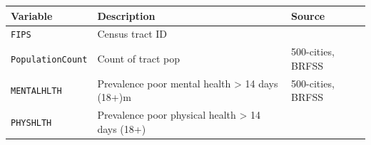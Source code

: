 \documentclass[
]{book}
\newcommand{\passthrough}[1]{#1}
\begin{document}
\begin{longtable}[]{@{}lll@{}}
\toprule
\begin{minipage}[b]{0.21\columnwidth}\raggedright
Variable\strut
\end{minipage} & \begin{minipage}[b]{0.40\columnwidth}\raggedright
Description\strut
\end{minipage} & \begin{minipage}[b]{0.30\columnwidth}\raggedright
Source\strut
\end{minipage}\tabularnewline
\midrule
\endhead
\begin{minipage}[t]{0.21\columnwidth}\raggedright
\passthrough{\lstinline!FIPS!}\strut
\end{minipage} & \begin{minipage}[t]{0.40\columnwidth}\raggedright
Census tract ID\strut
\end{minipage} & \begin{minipage}[t]{0.30\columnwidth}\raggedright
\strut
\end{minipage}\tabularnewline
\begin{minipage}[t]{0.21\columnwidth}\raggedright
\passthrough{\lstinline!PopulationCount!}\strut
\end{minipage} & \begin{minipage}[t]{0.40\columnwidth}\raggedright
Count of tract pop\strut
\end{minipage} & \begin{minipage}[t]{0.30\columnwidth}\raggedright
500-cities, BRFSS\strut
\end{minipage}\tabularnewline
\begin{minipage}[t]{0.21\columnwidth}\raggedright
\passthrough{\lstinline!MENTALHLTH!}\strut
\end{minipage} & \begin{minipage}[t]{0.40\columnwidth}\raggedright
Prevalence poor mental health \textgreater{} 14 days (18+)m\strut
\end{minipage} & \begin{minipage}[t]{0.30\columnwidth}\raggedright
500-cities, BRFSS\strut
\end{minipage}\tabularnewline
\begin{minipage}[t]{0.21\columnwidth}\raggedright
\passthrough{\lstinline!PHYSHLTH!}\strut
\end{minipage} & \begin{minipage}[t]{0.40\columnwidth}\raggedright
Prevalence poor physical health \textgreater{} 14 days (18+)\strut

\end{minipage}
\end{longtable}
\end{document}
